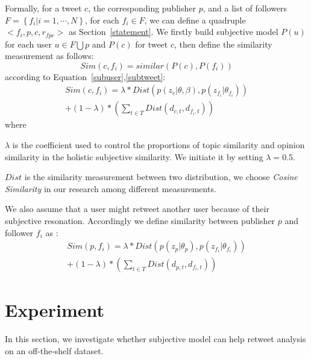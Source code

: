 \documentclass{acm_proc_article-sp}
\begin{document}
Formally, for a tweet $ c $, the corresponding publisher $ p $, and a list of followers $ F= \left\lbrace f_{i} \vert i=1, \cdots, N \right\rbrace  $, for each $ f_{i} \in F $, we can define a quadruple $ < f_{i}, p, c, r_{fpc} >  $ as Section~\ref{statement}.
We firstly build subjective model $ P\left( u \right)  $ for each user $ u \in F \bigcup p $ and $ P\left( c \right)  $ for tweet $ c $, then define the similarity measurement as follows:
\begin{equation}
Sim\left( c,f_{i} \right) = similar\left( P\left( c \right), P\left( f_{i} \right) \right)
\end{equation}
according to Equation~\ref{subuser},\ref{subtweet}:
\begin{equation}
\label{tweetfollower}
\begin{split}
Sim\left( c,f_{i} \right) = \lambda \ast Dist\left( p\left( z_{c} \vert \theta, \beta \right), p\left( z_{f_{i}} \vert \theta_{f_{i}} \right) \right) \\
+\left(1-\lambda \right) \ast \left( \sum_{t \in T} Dist \left( d_{c,t}, d_{f_{i}, t} \right)  \right)
\end{split}
\end{equation}
where 
\begin{itemize*}
\item $ \lambda $ is the coefficient used to control the proportions of topic similarity and opinion similarity in the holistic subjective similarity. We initiate it by setting $ \lambda =0.5 $. 
\item $ Dist $ is the similarity measurement between two distribution, we choose \emph{Cosine Similarity } in our research among different measurements.
\end{itemize*}
We also assume that a user might retweet another user because of their subjective resonation. Accordingly we define similarity between publisher $ p $ and follower $ f_{i} $ as :
\begin{equation}
\label{pubfollower}
\begin{split}
Sim\left( p,f_{i} \right) = \lambda \ast Dist\left( p\left( z_{p} \vert \theta_{p} \right), p\left( z_{f_{i}} \vert \theta_{f_{i}} \right) \right) \\
+\left(1-\lambda \right) \ast \left( \sum_{t \in T} Dist \left( d_{p,t}, d_{f_{i}, t} \right)  \right)
\end{split}
\end{equation}

\section{Experiment}
\label{experiment}
In this section, we investigate whether subjective model can help retweet analysis on an off-the-shelf dataset. 
\end{document}
